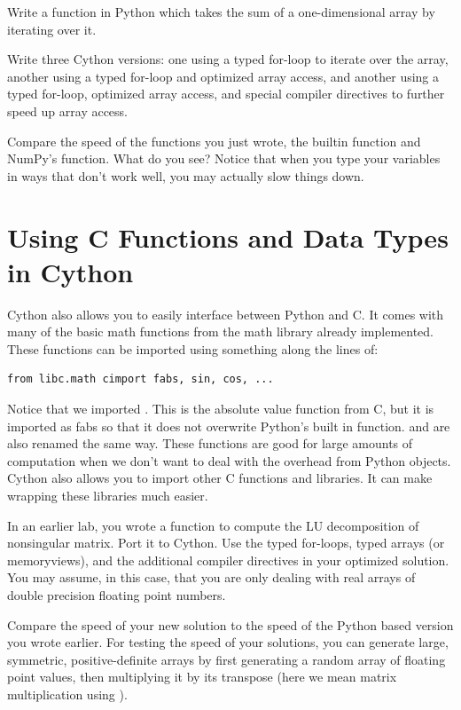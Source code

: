 \begin{problem}
Write a function in Python which takes the sum of a one-dimensional array by iterating over it.

Write three Cython versions: one using a typed for-loop to iterate over the array, another using a typed for-loop and optimized array access, and another using a typed for-loop, optimized array access, and special compiler directives to further speed up array access.

Compare the speed of the functions you just wrote, the builtin  function and NumPy's  function.
What do you see?
Notice that when you type your variables in ways that don't work well, you may actually slow things down.
\end{problem}

\section*{Using C Functions and Data Types in Cython}
Cython also allows you to easily interface between Python and C.
It comes with many of the basic math functions from the math library already implemented.
These functions can be imported using something along the lines of:
\begin{lstlisting}
from libc.math cimport fabs, sin, cos, ...
\end{lstlisting}
Notice that we imported .
This is the absolute value function from C, but it is imported as fabs so that it does not overwrite Python's built in  function. 
 and  are also renamed the same way.
These functions are good for large amounts of computation when we don't want to deal with the overhead from Python objects.
Cython also allows you to import other C functions and libraries.
It can make wrapping these libraries much easier.

\begin{problem}
In an earlier lab, you wrote a function to compute the LU decomposition of nonsingular matrix.
Port it to Cython.
Use the typed for-loops, typed arrays (or memoryviews), and the additional compiler directives in your optimized solution.
You may assume, in this case, that you are only dealing with real arrays of double precision floating point numbers.

Compare the speed of your new solution to the speed of the Python based version you wrote earlier.
For testing the speed of your solutions, you can generate large, symmetric, positive-definite arrays by first generating a random array of floating point values, then multiplying it by its transpose (here we mean matrix multiplication using ).
\end{problem}

